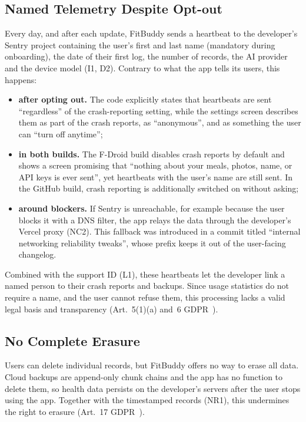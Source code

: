 \documentclass[a4paper,12pt]{article}
\begin{document}
\subsection{Named Telemetry Despite Opt-out}
\label{sec:issue-telemetry}
Every day, and after each update, FitBuddy sends a heartbeat to the developer's Sentry project
containing the user's first and last name (mandatory during onboarding), the date of their first
log, the number of records, the AI provider and the device model (I1, D2). Contrary to what the
app tells its users, this happens:
\begin{itemize}
  \item \textbf{after opting out.} The code explicitly states that heartbeats are sent
        ``regardless'' of the crash-reporting setting, while the settings screen describes them
        as part of the crash reports, as ``anonymous'', and as something the user can ``turn off
        anytime'';
  \item \textbf{in both builds.} The F-Droid build disables crash reports by default and shows a
        screen promising that ``nothing about your meals, photos, name, or API keys is ever
        sent'', yet heartbeats with the user's name are still sent. In the GitHub build, crash
        reporting is additionally switched on without asking;
  \item \textbf{around blockers.} If Sentry is unreachable, for example because the user blocks
        it with a DNS filter, the app relays the data through the developer's Vercel proxy
        (NC2). This fallback was introduced in a commit titled ``internal networking reliability
        tweaks'', whose prefix keeps it out of the user-facing changelog.
\end{itemize}
Combined with the support ID (L1), these heartbeats let the developer link a named person to
their crash reports and backups. Since usage statistics do not require a name, and the user
cannot refuse them, this processing lacks a valid legal basis and transparency (Art.~5(1)(a)
and~6 GDPR~\cite{gdpr}).

\subsection{No Complete Erasure}
\label{sec:issue-erasure}
Users can delete individual records, but FitBuddy offers no way to erase all data. Cloud backups
are append-only chunk chains and the app has no function to delete them, so health data persists
on the developer's servers after the user stops using the app. Together with the timestamped
records (NR1), this undermines the right to erasure (Art.~17 GDPR~\cite{gdpr}).
\end{document}
